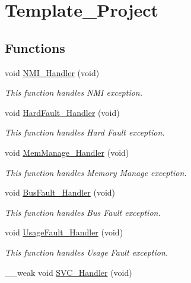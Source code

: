 \hypertarget{group___template___project}{\section{Template\+\_\+\+Project}
\label{group___template___project}
}
\subsection*{Functions}
\begin{DoxyCompactItemize}
\item 
void \hyperlink{group___template___project_ga6ad7a5e3ee69cb6db6a6b9111ba898bc}{N\+M\+I\+\_\+\+Handler} (void)
\begin{DoxyCompactList}\small\item\em This function handles N\+M\+I exception. \end{DoxyCompactList}\item 
void \hyperlink{group___template___project_ga2bffc10d5bd4106753b7c30e86903bea}{Hard\+Fault\+\_\+\+Handler} (void)
\begin{DoxyCompactList}\small\item\em This function handles Hard Fault exception. \end{DoxyCompactList}\item 
void \hyperlink{group___template___project_ga3150f74512510287a942624aa9b44cc5}{Mem\+Manage\+\_\+\+Handler} (void)
\begin{DoxyCompactList}\small\item\em This function handles Memory Manage exception. \end{DoxyCompactList}\item 
void \hyperlink{group___template___project_ga850cefb17a977292ae5eb4cafa9976c3}{Bus\+Fault\+\_\+\+Handler} (void)
\begin{DoxyCompactList}\small\item\em This function handles Bus Fault exception. \end{DoxyCompactList}\item 
void \hyperlink{group___template___project_ga1d98923de2ed6b7309b66f9ba2971647}{Usage\+Fault\+\_\+\+Handler} (void)
\begin{DoxyCompactList}\small\item\em This function handles Usage Fault exception. \end{DoxyCompactList}\item 
\+\_\+\+\_\+weak void \hyperlink{group___template___project_ga419352fd2993e5af0be52510ad0fb2e3}{S\+V\+C\+\_\+\+Handler} (void)

\end{DoxyCompactItemize}
